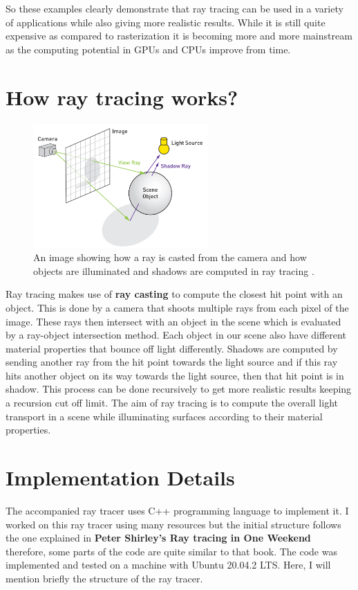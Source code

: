 \documentclass[11pt,a4paper]{article}
\begin{document}
	\noindent
	So these examples clearly demonstrate that ray tracing can be used in a variety of applications while also giving more realistic results. While it is still quite expensive as compared to rasterization it is becoming more and more mainstream as the computing potential in GPUs and CPUs improve from time.
	
	\section{How ray tracing works?}
	\begin{figure}[H]
		\centering
		\includegraphics[width=0.6\textwidth]{raytracing_gems.png}
		\caption{\centering An image showing how a ray is casted from the camera and how objects are illuminated and shadows are computed in ray tracing \protect\cite{haines2019ray}.}
	\end{figure}
	Ray tracing makes use of \textbf{ray casting} to compute the closest hit point with an object. This is done by a camera that shoots multiple rays from each pixel of the image. These rays then intersect with an object in the scene which is evaluated by a ray-object intersection method. Each object in our scene also have different material properties that bounce off light differently. Shadows are computed by sending another ray from the hit point towards the light source and if this ray hits another object on its way towards the light source, then that hit point is in shadow. This process can be done recursively to get more realistic results keeping a recursion cut off limit. The aim of ray tracing is to compute the overall light transport in a scene while illuminating surfaces according to their material properties.

	\section{Implementation Details}
	The accompanied ray tracer uses C++ programming language to implement it. I worked on this ray tracer using many resources but the initial structure follows the one explained in \textbf{Peter Shirley's Ray tracing in One Weekend} \cite{Shirley2020RTW1} therefore, some parts of the code are quite similar to that book. The code was implemented and tested on a machine with Ubuntu 20.04.2 LTS. Here, I will mention briefly the structure of the ray tracer.
\end{document}
